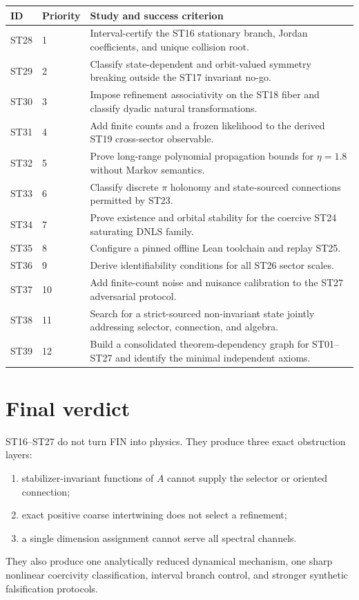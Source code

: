 \documentclass[11pt,a4paper]{article}
\begin{document}
\begin{longtable}{@{}p{}p{}p{}@{}}
\toprule
ID & Priority & Study and success criterion\\
\midrule
ST28 & 1 & Interval-certify the ST16 stationary branch, Jordan coefficients, and unique collision root.\\
ST29 & 2 & Classify state-dependent and orbit-valued symmetry breaking outside the ST17 invariant no-go.\\
ST30 & 3 & Impose refinement associativity on the ST18 fiber and classify dyadic natural transformations.\\
ST31 & 4 & Add finite counts and a frozen likelihood to the derived ST19 cross-sector observable.\\
ST32 & 5 & Prove long-range polynomial propagation bounds for $\eta=1.8$ without Markov semantics.\\
ST33 & 6 & Classify discrete $\pi$ holonomy and state-sourced connections permitted by ST23.\\
ST34 & 7 & Prove existence and orbital stability for the coercive ST24 saturating DNLS family.\\
ST35 & 8 & Configure a pinned offline Lean toolchain and replay ST25.\\
ST36 & 9 & Derive identifiability conditions for all ST26 sector scales.\\
ST37 & 10 & Add finite-count noise and nuisance calibration to the ST27 adversarial protocol.\\
ST38 & 11 & Search for a strict-sourced non-invariant state jointly addressing selector, connection, and algebra.\\
ST39 & 12 & Build a consolidated theorem-dependency graph for ST01--ST27 and identify the minimal independent axioms.\\
\bottomrule
\end{longtable}

\section{Final verdict}

ST16--ST27 do not turn FIN into physics. They produce three exact obstruction layers:
\begin{enumerate}
\item stabilizer-invariant functions of $A$ cannot supply the selector or oriented connection;
\item exact positive coarse intertwining does not select a refinement;
\item a single dimension assignment cannot serve all spectral channels.
\end{enumerate}
They also produce one analytically reduced dynamical mechanism, one sharp nonlinear coercivity classification, interval branch control, and stronger synthetic falsification protocols.
\end{document}
